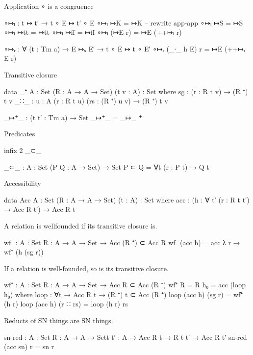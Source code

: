 Application ∘ is a congruence

\begin{code}
∘↦ₗ  :  t ↦ t′
     →  t ∘ E ↦ t′ ∘ E
∘↦ₗ ↦K      = ↦K  -- rewrite app-app
∘↦ₗ ↦S      = ↦S
∘↦ₗ ↦tt     = ↦tt
∘↦ₗ ↦ff     = ↦ff
∘↦ₗ (↦E r)  = ↦E (++↦ₗ r)

∘↦ᵣ  :  ∀ (t : Tm a)
     →  E ↦ₛ E′
     →  t ∘ E ↦ t ∘ E′
∘↦ᵣ (_∙_ h E) r = ↦E (++↦ᵣ E r)
\end{code}

Transitive closure


\begin{code}
data _⁺ {A : Set} (R : A → A → Set) (t v : A) : Set where
  sg   : (r : R t v) → (R ⁺) t v
  _∷_  : {u : A} (r : R t u) (rs : (R ⁺) u v) → (R ⁺) t v

_↦⁺_ : (t t′ : Tm a) → Set
_↦⁺_ = _↦_ ⁺
\end{code}


Predicates

\begin{code}
infix 2 _⊂_

_⊂_ : {A : Set} (P Q : A → Set) → Set
P ⊂ Q = ∀{t} (r : P t) → Q t
\end{code}

Accessibility

\begin{code}
data Acc {A : Set} (R : A → A → Set) (t : A) : Set where
  acc : (h : ∀ {t′} (r : R t t′) → Acc R t′) → Acc R t
\end{code}

A relation is wellfounded if its transitive closure is.

\begin{code}
wf⁻ : {A : Set} {R : A → A → Set} → Acc (R ⁺) ⊂ Acc R
wf⁻ (acc h) = acc λ r → wf⁻ (h (sg r))
\end{code}

If a relation is well-founded, so is its transitive closure.

\begin{code}
wf⁺ : {A : Set} {R : A → A → Set} → Acc R ⊂ Acc (R ⁺)
wf⁺ {R = R} h₀ = acc (loop h₀)
  where
  loop : ∀{t} → Acc R t → (R ⁺) t ⊂ Acc (R ⁺)
  loop (acc h) (sg r)    = wf⁺ (h r)
  loop (acc h) (r ∷ rs)  = loop (h r) rs
\end{code}

Reducts of SN things are SN things.

\begin{code}
sn-red : {A : Set} {R : A → A → Set}{t t′ : A} → Acc R t → R t t′ → Acc R t′
sn-red (acc sn) r = sn r
\end{code}

